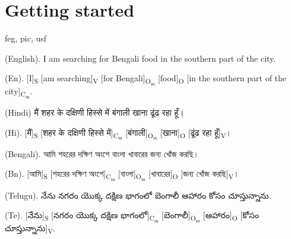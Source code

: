 
\chapter{Getting started}  %

\ifpdf
    \graphicspath{{Chapter1/Figs/Raster/}{Chapter1/Figs/PDF/}{Chapter1/Figs/}}
\else
    \graphicspath{{Chapter1/Figs/Vector/}{Chapter1/Figs/}}
\fi

\acrshort{feg}, \acrshort{pic}, \acrshort{usf}
\newline

(English). I am searching for Bengali food in the southern part of the city.

(En). [I]\textsubscript{S} [am searching]\textsubscript{V} [for Bengali]\textsubscript{$\text{O}_\text{m}$} [food]\textsubscript{O} [in the southern part of the city]\textsubscript{$\text{C}_\text{m}$}.

(Hindi) \texthindi{मैं शहर के दक्षिणी हिस्से में बंगाली खाना ढूंढ रहा हूँ।} 

(Hi). [\texthindi{मैं}]\textsubscript{S} [\texthindi{शहर के दक्षिणी हिस्से में}]\textsubscript{$\text{C}_\text{m}$} [\texthindi{बंगाली}]\textsubscript{$\text{O}_\text{m}$} [\texthindi{खाना}]\textsubscript{O} [\texthindi{ढूंढ रहा हूँ}]\textsubscript{V}\texthindi{।}

(Bengali). \textbengali{আমি শহরের দক্ষিণ অংশে বাংলা খাবারের জন্য খোঁজ করছি।}

(Bn). [\textbengali{আমি}]\textsubscript{S} [\textbengali{শহরের দক্ষিণ অংশে}]\textsubscript{$\text{C}_\text{m}$} [\textbengali{বাংলা}]\textsubscript{$\text{O}_\text{m}$} [\textbengali{খাবারের}]\textsubscript{O} [\textbengali{জন্য খোঁজ করছি}]\textsubscript{V}\textbengali{।}

(Telugu). \texttelugu{నేను నగరం యొక్క దక్షిణ భాగంలో బెంగాలీ ఆహారం కోసం చూస్తున్నాను}.

(Te). [\texttelugu{నేను}]\textsubscript{S} [\texttelugu{నగరం \hspace{0.25ex} యొక్క \hspace{0.25ex} దక్షిణ \hspace{0.25ex} భాగంలో}]\textsubscript{$\text{C}_\text{m}$} [\texttelugu{బెంగాలీ}]\textsubscript{$\text{O}_\text{m}$} [\texttelugu{ఆహారం}]\textsubscript{O} [\texttelugu{కోసం \hspace{0.25ex} చూస్తున్నాను}]\textsubscript{V}.

